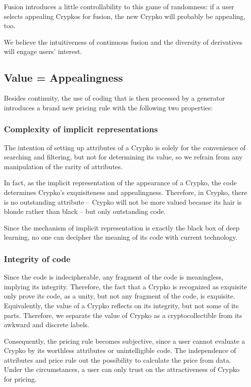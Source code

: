 \documentclass[b5paper]{article}
\begin{document}
Fusion introduces a little controllability to this game of randomness: if a user selects appealing Crypkos for fusion, the new Crypko will probably be appealing, too.

We believe the intuitiveness of continuous fusion and the diversity of derivatives will engage users' interest.


\subsection{Value = Appealingness}

Besides continuity, the use of coding that is then processed by a generator introduces a brand new pricing rule with the following two properties:

\subsubsection{Complexity of implicit representations}

The intention of setting up attributes of a Crypko is solely for the convenience of searching and filtering, but not for determining its value, so we refrain from any manipulation of the rarity of attributes.

In fact, as the implicit representation of the appearance of a Crypko, the code determines Crypko's exquisiteness and appealingness. Therefore, in Crypko, there is no outstanding attribute -- Crypko will not be more valued because its hair is blonde rather than black -- but only outstanding code. 

Since the mechanism of implicit representation is exactly the black box of deep learning, no one can decipher the meaning of its code with current technology.

\subsubsection{Integrity of code}

Since the code is indecipherable, any fragment of the code is meaningless, implying its integrity. Therefore, the fact that a Crypko is recognized as exquisite only prove its code, as a unity, but not any fragment of the code, is exquisite. Equivalently, the value of a Crypko reflects on its integrity, but not some of its parts. Therefore, we separate the value of Crypko as a cryptocollectible from its awkward and discrete labels.

Consequently, the pricing rule becomes subjective, since a user cannot evaluate a Crypko by its worthless attributes or unintelligible code. The independence of attributes and price rule out the possibility to calculate the price from data. Under the circumstances, a user can only trust on the attractiveness of Crypko for pricing.
\end{document}
